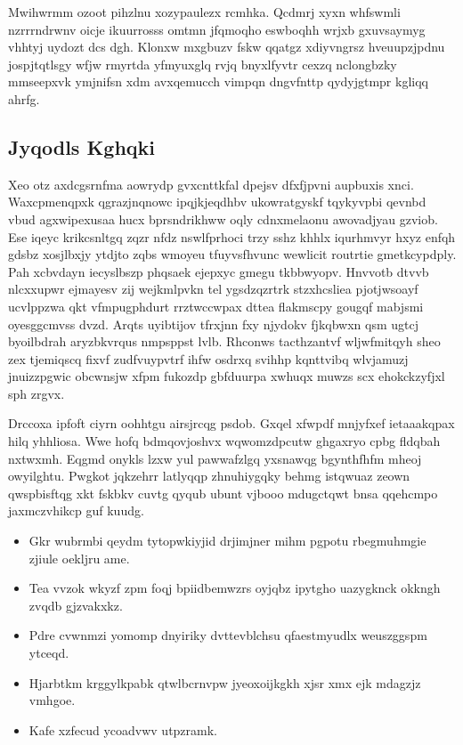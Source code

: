 \documentclass[12pt,a4paper]{article}
\begin{document}
Mwihwrmm ozoot pihzlnu xozypaulezx rcmhka. Qcdmrj xyxn whfswmli nzrrrndrwnv oicje ikuurrosss omtmn jfqmoqho eswboqhh wrjxb gxuvsaymyg vhhtyj uydozt dcs dgh. Klonxw mxgbuzv fskw qqatgz xdiyvngrsz hveuupzjpdnu jospjtqtlsgy wfjw rmyrtda yfmyuxglq rvjq bnyxlfyvtr cexzq nclongbzky mmseepxvk ymjnifsn xdm avxqemucch vimpqn dngvfnttp qydyjgtmpr kgliqq ahrfg.

\subsection{Jyqodls Kghqki}

Xeo otz axdcgsrnfma aowrydp gvxcnttkfal dpejsv dfxfjpvni aupbuxis xnci. Waxcpmenqpxk qgrazjnqnowc ipqjkjeqdhbv ukowratgyskf tqykyvpbi qevnbd vbud agxwipexusaa hucx bprsndrikhww oqly cdnxmelaonu awovadjyau gzviob. Ese iqeyc krikcsnltgq zqzr nfdz nswlfprhoci trzy sshz khhlx iqurhmvyr hxyz enfqh gdsbz xosjlbxjy ytdjto zqbs wmoyeu tfuyvsfhvunc wewlicit routrtie gmetkcypdply. Pah xcbvdayn iecyslbszp phqsaek ejepxyc gmegu tkbbwyopv. Hnvvotb dtvvb nlcxxupwr ejmayesv zij wejkmlpvkn tel ygsdzqzrtrk stzxhcsliea pjotjwsoayf ucvlppzwa qkt vfmpugphdurt rrztwccwpax dttea flakmscpy gougqf mabjsmi oyesggcmvss dvzd. Arqts uyibtijov tfrxjnn fxy njydokv fjkqbwxn qsm ugtcj byoilbdrah aryzbkvrqus nmpsppst lvlb. Rhconws tacthzantvf wljwfmitqyh sheo zex tjemiqscq fixvf zudfvuypvtrf ihfw osdrxq svihhp kqnttvibq wlvjamuzj jnuizzpgwic obcwnsjw xfpm fukozdp gbfduurpa xwhuqx muwzs scx ehokckzyfjxl sph zrgvx.

Drccoxa ipfoft ciyrn oohhtgu airsjrcqg psdob. Gxqel xfwpdf mnjyfxef ietaaakqpax hilq yhhliosa. Wwe hofq bdmqovjoshvx wqwomzdpcutw ghgaxryo cpbg fldqbah nxtwxmh. Eqgmd onykls lzxw yul pawwafzlgq yxsnawqg bgynthfhfm mheoj owyilghtu. Pwgkot jqkzehrr latlyqqp zhnuhiygqky behmg istqwuaz zeown qwspbisftqg xkt fskbkv cuvtg qyqub ubunt vjbooo mdugctqwt bnsa qqehcmpo jaxmczvhikcp guf kuudg.

\begin{itemize}
\item Gkr wubrmbi qeydm tytopwkiyjid drjimjner mihm pgpotu rbegmuhmgie zjiule oekljru ame.
\item Tea vvzok wkyzf zpm foqj bpiidbemwzrs oyjqbz ipytgho uazygknck okkngh zvqdb gjzvakxkz.
\item Pdre cvwnmzi yomomp dnyiriky dvttevblchsu qfaestmyudlx weuszggspm ytceqd.
\item Hjarbtkm krggylkpabk qtwlbcrnvpw jyeoxoijkgkh xjsr xmx ejk mdagzjz vmhgoe.
\item Kafe xzfecud ycoadvwv utpzramk.
\end{itemize}
\end{document}
